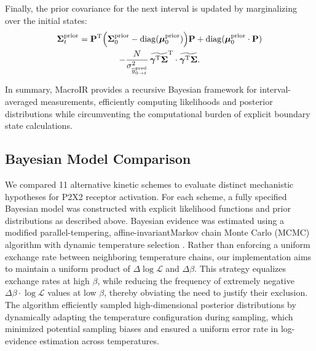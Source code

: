 \documentclass[pdflatex,sn-nature]{sn-jnl}%
\begin{document}
Finally, the prior covariance for the next interval is updated by marginalizing over the initial states:
\begin{multline}
	\boldsymbol{\Sigma}^{\text{prior}}_{t} = \mathbf{P}^{\mathrm{T}} \Bigl( \boldsymbol{\Sigma}^{\text{prior}}_{0} - \mathrm{diag}(\boldsymbol{\mu}^{\text{prior}}_{0}) \Bigr) \mathbf{P} + \mathrm{diag}(\boldsymbol{\mu}^{\text{prior}}_{0} \cdot \mathbf{P}) \\
	- \frac{N}{\sigma^2_{\overline{y}^{\text{pred}}_{0 \rightarrow t}}} \, \widetilde{\boldsymbol{\gamma}^{\mathrm{T}} \boldsymbol{\Sigma}}^{\mathrm{T}} \cdot \widetilde{\boldsymbol{\gamma}^{\mathrm{T}} \boldsymbol{\Sigma}}.
	\label{eq:prior_covariance_update_0_t}
\end{multline}

In summary, MacroIR provides a recursive Bayesian framework for interval-averaged measurements, efficiently computing likelihoods and posterior distributions while circumventing the computational burden of explicit boundary state calculations.

\subsection{Bayesian Model Comparison}  
We compared 11 alternative kinetic schemes to evaluate distinct mechanistic hypotheses for P2X2 receptor activation. For each scheme, a fully specified Bayesian model was constructed with explicit likelihood functions and prior distributions as described above. Bayesian evidence was estimated using a modified parallel-tempering, affine-invariant\cite{goodman2010ensemble}Markov chain Monte Carlo (MCMC) algorithm  with dynamic temperature selection \cite{vousden2016dynamic}. Rather than enforcing a uniform exchange rate between neighboring temperature chains, our implementation aims to maintain a uniform product of $\Delta\log\mathcal{L}$ and $\Delta\beta$. This strategy equalizes exchange rates at high $\beta$, while reducing the frequency of extremely negative $\Delta\beta\cdot\log\mathcal{L}$ values at low $\beta$, thereby obviating the need to justify their exclusion. The algorithm efficiently sampled high-dimensional posterior distributions by dynamically adapting the temperature configuration during sampling, which minimized potential sampling biases and ensured a uniform error rate in log-evidence estimation across temperatures.
\end{document}
